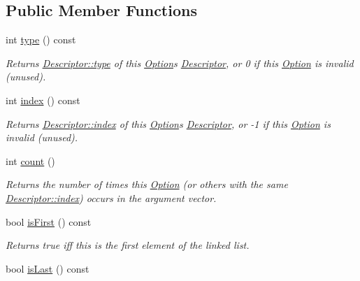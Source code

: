 \subsection*{Public Member Functions}
\begin{DoxyCompactItemize}
\item 
int \hyperlink{classoption_1_1Option_a5268a69e1a91137186ab772574296da0}{type} () const
\begin{DoxyCompactList}\small\item\em Returns \hyperlink{structoption_1_1Descriptor_a1b220dabd8aad075fa441a80f9b9343c}{Descriptor\+::type} of this \hyperlink{classoption_1_1Option}{Option}\textquotesingle{}s \hyperlink{structoption_1_1Descriptor}{Descriptor}, or 0 if this \hyperlink{classoption_1_1Option}{Option} is invalid (unused). \end{DoxyCompactList}\item 
\mbox{\label{classoption_1_1Option_a847d12e8e76add769fbd01c703e48682}} 
int \hyperlink{classoption_1_1Option_a847d12e8e76add769fbd01c703e48682}{index} () const
\begin{DoxyCompactList}\small\item\em Returns \hyperlink{structoption_1_1Descriptor_a1fee8ac44f529c99ac2b1149b4c391b1}{Descriptor\+::index} of this \hyperlink{classoption_1_1Option}{Option}\textquotesingle{}s \hyperlink{structoption_1_1Descriptor}{Descriptor}, or -\/1 if this \hyperlink{classoption_1_1Option}{Option} is invalid (unused). \end{DoxyCompactList}\item 
int \hyperlink{classoption_1_1Option_a8a632dcd89af60fe0806deb756c08f14}{count} ()
\begin{DoxyCompactList}\small\item\em Returns the number of times this \hyperlink{classoption_1_1Option}{Option} (or others with the same \hyperlink{structoption_1_1Descriptor_a1fee8ac44f529c99ac2b1149b4c391b1}{Descriptor\+::index}) occurs in the argument vector. \end{DoxyCompactList}\item 
bool \hyperlink{classoption_1_1Option_af51f53a553ef46110e36008a58466a2e}{is\+First} () const
\begin{DoxyCompactList}\small\item\em Returns true iff this is the first element of the linked list. \end{DoxyCompactList}\item 
bool \hyperlink{classoption_1_1Option_a36fa8fde6fce89462ded79ab56180ff7}{is\+Last} () const

\end{DoxyCompactItemize}

